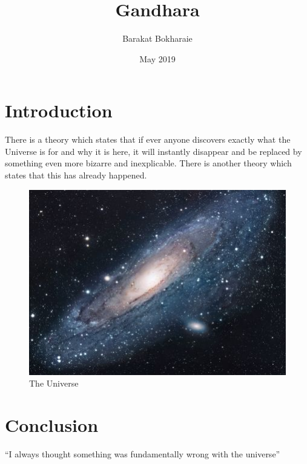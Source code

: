 \documentclass{article}
\title{Gandhara}
\author{Barakat Bokharaie}
\date{May 2019}
\begin{document}
\maketitle

\section{Introduction}
There is a theory which states that if ever anyone discovers exactly what the Universe is for and why it is here, it will instantly disappear and be replaced by something even more bizarre and inexplicable.
There is another theory which states that this has already happened.

\begin{figure}[h!]
\centering
\includegraphics[scale=1.7]{universe}
\caption{The Universe}
\label{fig:universe}
\end{figure}

\section{Conclusion}
``I always thought something was fundamentally wrong with the universe'' \citep{adams1995hitchhiker}



\end{document}
